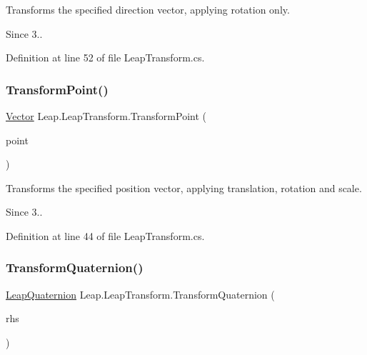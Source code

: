 Transforms the specified direction vector, applying rotation only. 

\begin{DoxySince}{Since}
3.. 
\end{DoxySince}


Definition at line 52 of file Leap\+Transform.\+cs.

\mbox{\label{struct_leap_1_1_leap_transform_a069ce8e414f0def9697b7816dcc4a799}} 
\subsubsection{\texorpdfstring{TransformPoint()}{TransformPoint()}}
{\footnotesize\ttfamily \mbox{\hyperlink{struct_leap_1_1_vector}{Vector}} Leap.\+Leap\+Transform.\+Transform\+Point (\begin{DoxyParamCaption}\item[{\mbox{\hyperlink{struct_leap_1_1_vector}{Vector}}}]{point }\end{DoxyParamCaption})}



Transforms the specified position vector, applying translation, rotation and scale. 

\begin{DoxySince}{Since}
3.. 
\end{DoxySince}


Definition at line 44 of file Leap\+Transform.\+cs.

\mbox{\label{struct_leap_1_1_leap_transform_ad9658850a91beef88214dcaac6f6e6af}} 
\subsubsection{\texorpdfstring{TransformQuaternion()}{TransformQuaternion()}}
{\footnotesize\ttfamily \mbox{\hyperlink{struct_leap_1_1_leap_quaternion}{Leap\+Quaternion}} Leap.\+Leap\+Transform.\+Transform\+Quaternion (\begin{DoxyParamCaption}\item[{\mbox{\hyperlink{struct_leap_1_1_leap_quaternion}{Leap\+Quaternion}}}]{rhs }\end{DoxyParamCaption})}




